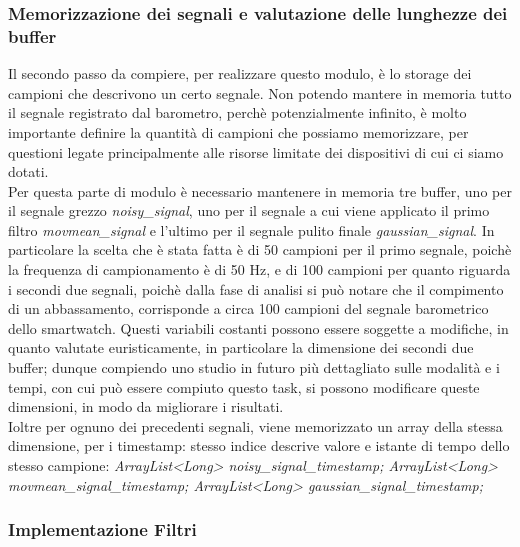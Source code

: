 \documentclass[a4paper]{article}
\begin{document}
\subsubsection{Memorizzazione dei segnali e valutazione delle lunghezze dei buffer}
Il secondo passo da compiere, per realizzare questo modulo, è lo storage dei campioni che descrivono un certo segnale. Non potendo mantere in memoria tutto il segnale registrato dal barometro, perchè potenzialmente infinito, è molto importante definire la quantità di campioni che possiamo memorizzare, per questioni legate principalmente alle risorse limitate dei dispositivi di cui ci siamo dotati. \\
Per questa parte di modulo è necessario mantenere in memoria tre buffer, uno per il segnale grezzo \textit{noisy\_signal}, uno per il segnale a cui viene applicato il primo filtro \textit{movmean\_signal} e l'ultimo per il segnale pulito finale \textit{gaussian\_signal}. In particolare la scelta che è stata fatta è di 50 campioni per il primo segnale, poichè la frequenza di campionamento è di 50 Hz, e di 100 campioni per quanto riguarda i secondi due segnali, poichè dalla fase di analisi si può notare che il compimento di un abbassamento, corrisponde a circa 100 campioni del segnale barometrico dello smartwatch. Questi variabili costanti possono essere soggette a modifiche, in quanto valutate euristicamente, in particolare la dimensione dei secondi due buffer; dunque compiendo uno studio in futuro più dettagliato sulle modalità e i tempi, con cui può essere compiuto questo task, si possono modificare queste dimensioni, in modo da migliorare i risultati. \\
 
Ioltre per ognuno dei precedenti segnali, viene memorizzato un array della stessa dimensione, per i timestamp: stesso indice descrive valore e istante di tempo dello stesso campione: \textit{ArrayList<Long> noisy\_signal\_timestamp; ArrayList<Long> movmean\_signal\_timestamp; ArrayList<Long> gaussian\_signal\_timestamp;}

\subsubsection{Implementazione Filtri}

\end{document}
